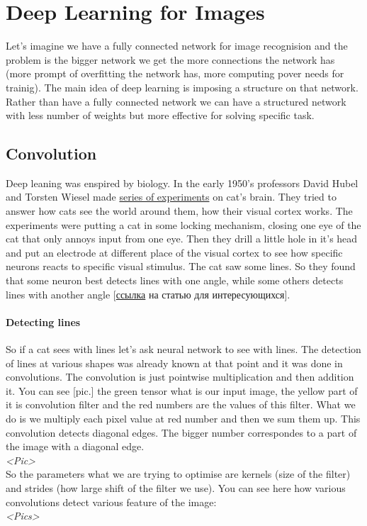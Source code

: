 \chapter{Deep Learning for Images}

{\sf Let's imagine we have a fully connected network for image recognision and the problem is the bigger network we get the more connections the network has (more prompt of overfitting the network has, more computing pover needs for trainig). The main idea of deep learning is imposing a structure on that network. Rather than have a fully connected network we can have a structured network with less number of weights but more effective for solving specific task.}

\section{Convolution}

Deep leaning was enspired by biology. In the early 1950's professors David Hubel and Torsten Wiesel made \href{https://youtu.be/IOHayh06LJ4}{series of experiments} on cat's brain. They tried to answer how cats see the world around them, how their visual cortex works. The experiments were putting a cat in some locking mechanism, closing one eye of the cat that only annoys input from one eye. Then they drill a little hole in it's head and put an electrode at different place of the visual cortex to see how specific neurons reacts to specific visual stimulus. The cat saw some lines. So they found that some neuron best detects lines with one angle, while some others detects lines with another angle [\href{https://www.ncbi.nlm.nih.gov/pmc/articles/PMC1363130/pdf/jphysiol01298-0128.pdf}{ссылка} на статью для интересующихся].

\subsubsection*{Detecting lines}

So if a cat sees with lines let's ask neural network to see with lines. The detection of lines at various shapes was already known at that point and it was done in convolutions. The convolution is just pointwise multiplication and then addition it. You can see [pic.] the green tensor what is our input image, the yellow part of it is convolution filter and the red numbers are the values of this filter. What we do is we multiply each pixel value at red number and then we sum them up. This convolution detects diagonal edges. The bigger number correspondes to a part of the image with a diagonal edge.\\
{\it <Pic>}\\
So the parameters what we are trying to optimise are kernels (size of the filter) and strides (how large shift of the filter we use). You can see here how various convolutions detect various feature of the image:\\
{\it <Pics>}\\

